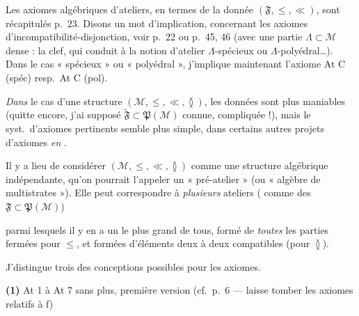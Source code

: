 \documentclass[11pt,a4paper]{article}
\begin{document}
Les axiomes algébriques d'ateliers, en termes de la donnée $(\mathfrak{F}, \leq, \ll)$, sont récapitulés p.~23. Disons un mot d'implication, concernant les axiomes d'incompatibilité-disjonction, voir p.~22 ou p.~45, 46 (avec une partie $\Lambda \subset \mathcal{M}$ dense : la clef, qui conduit à la notion d'atelier $\Lambda$-spécieux ou $\Lambda$-polyédral…). Dans le cas « spécieux » ou « polyédral », j'implique maintenant l'axiome At C (spéc) resp.\ At C (pol).

\emph{Dans} le cas d'une structure $(\mathcal{M}, \leq, \ll, \between)$, les données sont plus maniables (quitte encore, j'ai supposé $\widetilde{\mathfrak{F}} \subset \mathfrak{P}(\mathcal{M})$ connue,  compliquée !), mais le syst.\ d'axiomes pertinents semble plus simple, dans certains  autres projets d'axiomes \emph{en} .

Il y a lieu de considérer $(\mathcal{M}, \leq, \ll, \between)$ comme une structure algébrique indépendante, qu'on pourrait l'appeler un « pré-atelier » (ou « algèbre de multistrates »). Elle peut correspondre à \emph{plusieurs} ateliers ( comme des $\mathfrak{F} \subset \mathfrak{P}(\mathcal{M})$)

parmi lesquels il y en a un le plus grand de tous, formé de \emph{toutes} les parties  fermées pour $\leq$, et formées d'éléments deux à deux compatibles (pour $\between$).

J'distingue trois des conceptions possibles pour les axiomes.

\textbf{(1)}   At 1 à At 7 sans plus, première version (cf.\ p.~6 \struck{\ill{}} —  laisse tomber les axiomes relatifs à f)
\end{document}

